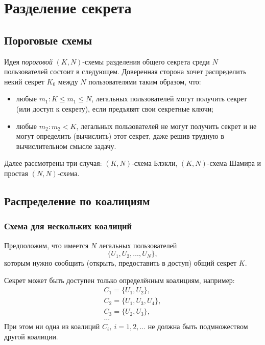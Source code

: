 \chapter{Разделение секрета}

\section{Пороговые схемы}

Идея \emph{пороговой} $(K, N)$-схемы разделения общего секрета среди $N$ пользователей состоит в следующем. Доверенная сторона хочет распределить некий секрет $K_0$ между $N$ пользователями таким образом, что:
\begin{itemize}
    \item любые $m_1: K \leq m_1 \leq N$, легальных пользователей могут получить секрет (или доступ к секрету), если предъявят свои секретные ключи;
    \item любые $m_2: m_2 < K$, легальных пользователей не могут получить секрет и не могут определить (вычислить) этот секрет, даже решив трудную в вычислительном смысле задачу.
\end{itemize}

Далее рассмотрены три случая: $(K, N)$-схема Блэкли, $(K, N)$-схема Шамира и простая $(N,N)$-схема.







\section{Распределение по коалициям}

\subsection{Схема для нескольких коалиций}

Предположим, что имеется $N$ легальных пользователей
    \[ \{ U_1, U_2, \dots, U_N \}, \]
которым нужно сообщить (открыть, предоставить в доступ) общий секрет $K$.

Секрет может быть доступен только определённым коалициям, например:
\[ \begin{array}{l}
    C_1 = \{ U_1, U_2 \}, \\
    C_2 = \{ U_1, U_3, U_4 \}, \\
    C_3 = \{ U_2, U_3 \}, \\
    \dots
\end{array} \]
При этом ни одна из коалиций $C_i, ~ i = 1, 2, \dots$ не должна быть подмножеством другой коалиции.


